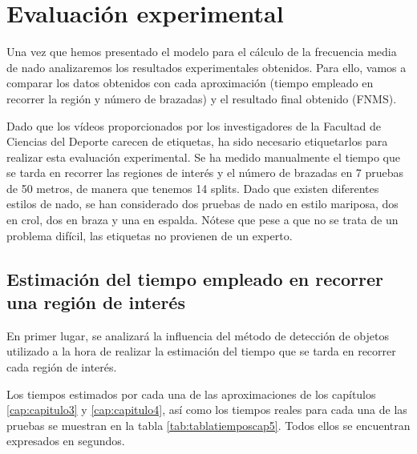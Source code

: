 \section{Evaluación experimental} \label{sec:resultadoscalculos}

Una vez que hemos presentado el modelo para el cálculo de la frecuencia media de nado analizaremos los resultados experimentales obtenidos. Para ello, vamos a comparar los datos obtenidos con cada aproximación (tiempo empleado en recorrer la región y número de brazadas) y el resultado final obtenido (FNMS).

Dado que los vídeos proporcionados por los investigadores de la Facultad de Ciencias del Deporte carecen de etiquetas, ha sido necesario etiquetarlos para realizar esta evaluación experimental. Se ha medido manualmente el tiempo que se tarda en recorrer las regiones de interés y el número de brazadas en 7 pruebas de 50 metros, de manera que tenemos 14 splits. Dado que existen diferentes estilos de nado, se han considerado dos pruebas de nado en estilo mariposa, dos en crol, dos en braza y una en espalda. Nótese que pese a que no se trata de un problema difícil, las etiquetas no provienen de un experto. 

\subsection{Estimación del tiempo empleado en recorrer una región de interés}
En primer lugar, se analizará la influencia del método de detección de objetos utilizado a la hora de realizar la estimación del tiempo que se tarda en recorrer cada región de interés.

Los tiempos estimados por cada una de las aproximaciones de los capítulos \ref{cap:capitulo3} y \ref{cap:capitulo4}, así como los tiempos reales para cada una de las pruebas se muestran en la tabla \ref{tab:tablatiemposcap5}. Todos ellos se encuentran expresados en segundos.

